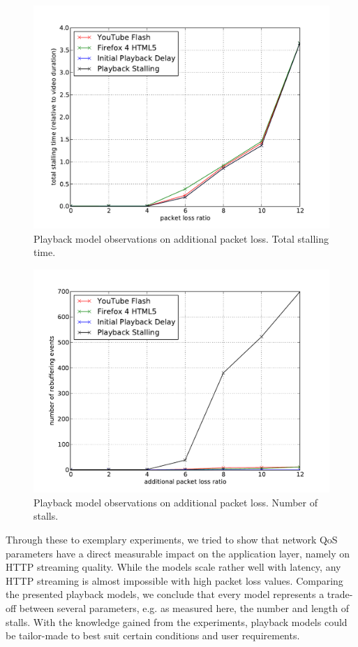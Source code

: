 \begin{figure}[htb]
    \centering
    \includegraphics[width=\textwidth]{images/eval-loss4mb-stallingtime.pdf}
    \caption{Playback model observations on additional packet loss. Total stalling time.}
    \label{c3:fig:eval-loss-stallingtime}
\end{figure}

\begin{figure}[htb]
    \centering
    \includegraphics[width=\textwidth]{images/eval-loss4mb-frequency.pdf}
    \caption{Playback model observations on additional packet loss. Number of stalls.}
    \label{c3:fig:eval-loss-numstalls}
\end{figure}
 
Through these to exemplary experiments, we tried to show that network QoS parameters have a direct measurable impact on the application layer, namely on HTTP streaming quality. While the models scale rather well with latency, any HTTP streaming is almost impossible with high packet loss values.
Comparing the presented playback models, we conclude that every model represents a trade-off between several parameters, e.g. as measured here, the number and length of stalls. With the knowledge gained from the experiments, playback models could be tailor-made to best suit certain conditions and user requirements. 

